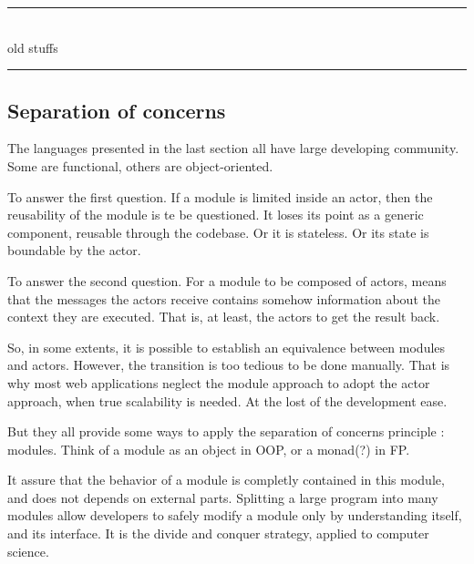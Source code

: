 \begin{center}
\rule{4cm}{0.4pt}\\
old stuffs\\
\rule{4cm}{0.4pt}
\end{center}



\subsection{Separation of concerns}



The languages presented in the last section all have large developing community. Some are functional, others are object-oriented.

To answer the first question.
If a module is limited inside an actor, then the reusability of the module is te be questioned.
It loses its point as a generic component, reusable through the codebase.
Or it is stateless.
Or its state is boundable by the actor.

To answer the second question.
For a module to be composed of actors, means that the messages the actors receive contains somehow information about the context they are executed.
That is, at least, the actors to get the result back.

So, in some extents, it is possible to establish an equivalence between modules and actors. However, the transition is too tedious to be done manually.
That is why most web applications neglect the module approach to adopt the actor approach, when true scalability is needed.
At the lost of the development ease.


But they all provide some ways to apply the separation of concerns principle : modules.
Think of a module as an object in OOP, or a monad(?) in FP.

It assure that the behavior of a module is completly contained in this module, and does not depends on external parts.
Splitting a large program into many modules allow developers to safely modify a module only by understanding itself, and its interface.
It is the divide and conquer strategy, applied to computer science.

